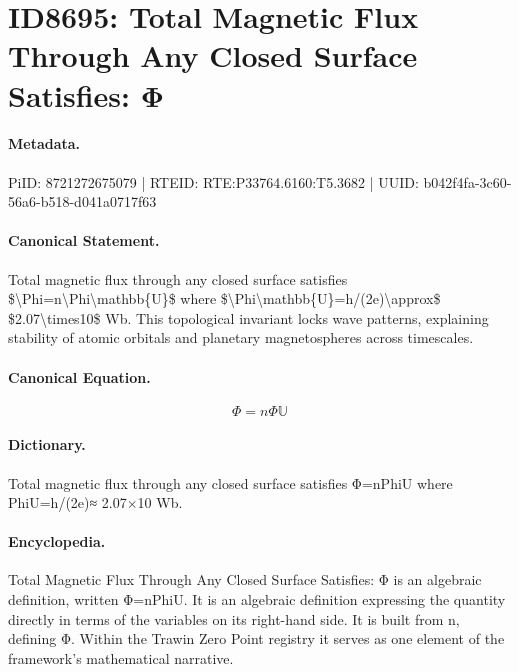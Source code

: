 \section*{ID8695: Total Magnetic Flux Through Any Closed Surface Satisfies: Φ}
\paragraph{Metadata.}
PiID: 8721272675079 | RTEID: RTE:P33764.6160:T5.3682 | UUID: b042f4fa-3c60-56a6-b518-d041a0717f63

\paragraph{Canonical Statement.}
Total magnetic flux through any closed surface satisfies \$\textbackslash{}Phi=n\textbackslash{}Phi\textbackslash{}mathbb\{U\}\$ where \$\textbackslash{}Phi\textbackslash{}mathbb\{U\}=h/(2e)\textbackslash{}approx\$ \$2.07\textbackslash{}times10\$ Wb. This topological invariant locks wave patterns, explaining stability of atomic orbitals and planetary magnetospheres across timescales.

\paragraph{Canonical Equation.}
\[
\Phi=n\Phi\mathbb{U}
\]

\paragraph{Dictionary.}
Total magnetic flux through any closed surface satisfies Φ=nPhiU where PhiU=h/(2e)≈ 2.07×10 Wb.

\paragraph{Encyclopedia.}
Total Magnetic Flux Through Any Closed Surface Satisfies: Φ is an algebraic definition, written Φ=nPhiU. It is an algebraic definition expressing the quantity directly in terms of the variables on its right-hand side. It is built from n, defining Φ. Within the Trawin Zero Point registry it serves as one element of the framework's mathematical narrative.
